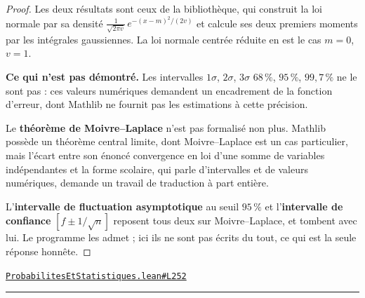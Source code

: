 \documentclass[11pt,a4paper]{article}
\theoremstyle{definition}
\theoremstyle{plain}
\newcommand{\source}[2]{\par\smallskip\noindent\hfill{\footnotesize\href{#1}{\texttt{#2}}}\par\smallskip}
\begin{document}
\begin{proof}
Les deux résultats sont ceux de la bibliothèque, qui construit la loi normale par sa
densité $\frac{1}{\sqrt{2\pi v}}\,e^{-(x-m)^{2}/(2v)}$ et calcule ses deux premiers moments
par les intégrales gaussiennes. La loi normale centrée réduite en est le cas $m = 0$,
$v = 1$.

\medskip\noindent
\textbf{Ce qui n'est pas démontré.} Les intervalles $1\sigma$, $2\sigma$, $3\sigma$ \textemdash{}
$68\,\%$, $95\,\%$, $99{,}7\,\%$ \textemdash{} ne le sont pas : ces valeurs numériques
demandent un encadrement de la fonction d'erreur, dont Mathlib ne fournit pas les
estimations à cette précision.

\medskip\noindent
Le \textbf{théorème de Moivre--Laplace} n'est pas formalisé non plus. Mathlib possède un
théorème central limite, dont Moivre--Laplace est un cas particulier, mais l'écart entre son
énoncé \textemdash{} convergence en loi d'une somme de variables indépendantes \textemdash{}
et la forme scolaire, qui parle d'intervalles et de valeurs numériques, demande un travail
de traduction à part entière.

\medskip\noindent
L'\textbf{intervalle de fluctuation asymptotique} au seuil $95\,\%$ et l'\textbf{intervalle
de confiance} $[f \pm 1/\sqrt{n}]$ reposent tous deux sur Moivre--Laplace, et tombent avec
lui. Le programme les admet ; ici ils ne sont pas écrits du tout, ce qui est la seule
réponse honnête.
\end{proof}
\source{https://github.com/Commutator-IO/learn-lean/blob/main/cours/02-lycee/09-probabilites-et-statistiques/ProbabilitesEtStatistiques.lean\#L252}{ProbabilitesEtStatistiques.lean\#L252}

\vfill
\noindent\rule{0.35\linewidth}{0.4pt}\par
{}
\end{document}
